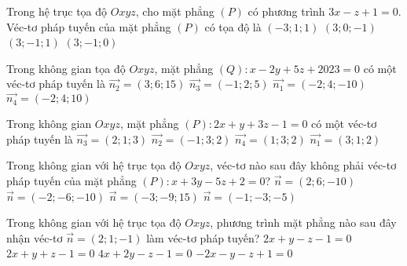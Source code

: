 \begin{ex}%
		Trong hệ trục tọa độ $Oxyz$, cho mặt phẳng $(P)$ có phương trình $3x-z+1=0$. Véc-tơ pháp tuyến của mặt phẳng $(P)$ có tọa độ là
	\choice
	{$(-3;1;1)$}
	{\True $(3;0;-1)$}
	{$(3;-1;1)$}
	{$(3;-1;0)$}
\end{ex}


\begin{ex}%
	Trong không gian tọa độ $Oxyz$, mặt phẳng $(Q) \colon x-2y+5z+2023=0$ có một véc-tơ pháp tuyến là
	\choice
	{$\overrightarrow{n_2}=(3;6;15)$}
	{$\overrightarrow{n_3}=(-1;2;5)$}
	{\True $\overrightarrow{n_1}=(-2;4;-10)$}
	{$\overrightarrow{n_4}=(-2;4;10)$}
\end{ex}

\begin{ex}%
Trong không gian $Oxyz$, mặt phẳng $(P) \colon 2x+y+3z-1=0$ có một véc-tơ pháp tuyến là
	\choice
	{$\overrightarrow{n_3}=(2;1;3)$}
	{$\overrightarrow{n_2}=(-1;3;2)$}
	{$\overrightarrow{n_4}=(1;3;2)$}
	{$\overrightarrow{n_1}=(3;1;2)$}
\end{ex}

\begin{ex}%
	Trong không gian với hệ trục tọa độ $Oxyz$, véc-tơ nào sau đây không phải véc-tơ pháp tuyến của mặt phẳng $(P) \colon x+3y-5z+2=0$?
	\choice
	{$\overrightarrow{n}=(2;6;-10)$}
	{\True $\overrightarrow{n}=(-2;-6;-10)$}
	{$\overrightarrow{n}=(-3;-9;15)$}
	{$\overrightarrow{n}=(-1;-3;-5)$}
\end{ex}
 \begin{ex}%
 		Trong không gian với hệ trục tọa độ $Oxyz$, phương trình mặt phẳng nào sau đây nhận véc-tơ $\overrightarrow{n}=(2;1;-1)$ làm véc-tơ pháp tuyến?
 	\choice
 	{\True $2x+y-z-1=0$}
 	{$2x+y+z-1=0$}
 	{$4x+2y-z-1=0$}
 	{$-2x-y-z+1=0$}
 \end{ex}

